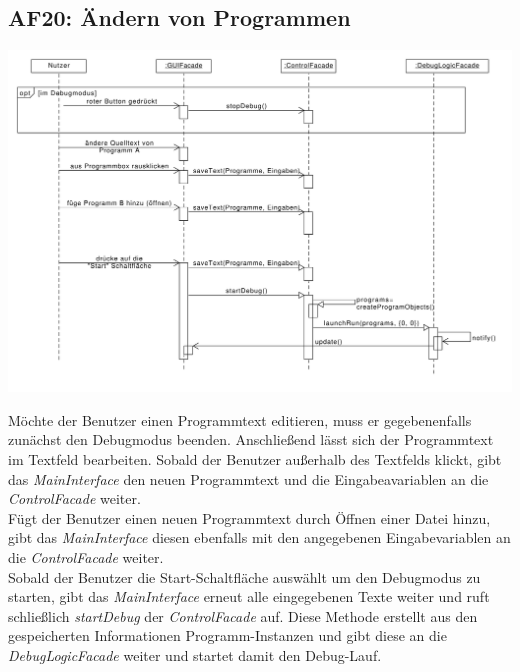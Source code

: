 \documentclass[parskip=full]{scrartcl}
\begin{document}
\newpage
\subsection{AF20: Ändern von Programmen}
\begin{center}
\includegraphics[width=1.0\textwidth]{diagrammIdeenUmlet/SequenceDiagrams/seq_AF20PDF.pdf}
\end{center}
Möchte der Benutzer einen Programmtext editieren, muss er gegebenenfalls zunächst den Debugmodus beenden.
Anschließend lässt sich der Programmtext im Textfeld bearbeiten. Sobald der Benutzer außerhalb des Textfelds klickt, gibt das \textit{MainInterface} den neuen Programmtext und die Eingabeavariablen an die \textit{ControlFacade} weiter. \\
Fügt der Benutzer einen neuen Programmtext durch Öffnen einer Datei hinzu, gibt das \textit{MainInterface} diesen ebenfalls mit den angegebenen Eingabevariablen an die \textit{ControlFacade} weiter.\\
Sobald der Benutzer die Start-Schaltfläche auswählt um den Debugmodus zu starten, gibt das \textit{MainInterface} erneut alle eingegebenen Texte weiter und ruft schließlich \textit{startDebug} der \textit{ControlFacade} auf. 
Diese Methode erstellt aus den gespeicherten Informationen Programm-Instanzen und gibt diese an die \textit{DebugLogicFacade} weiter und startet damit den Debug-Lauf.

\newpage
\end{document}
